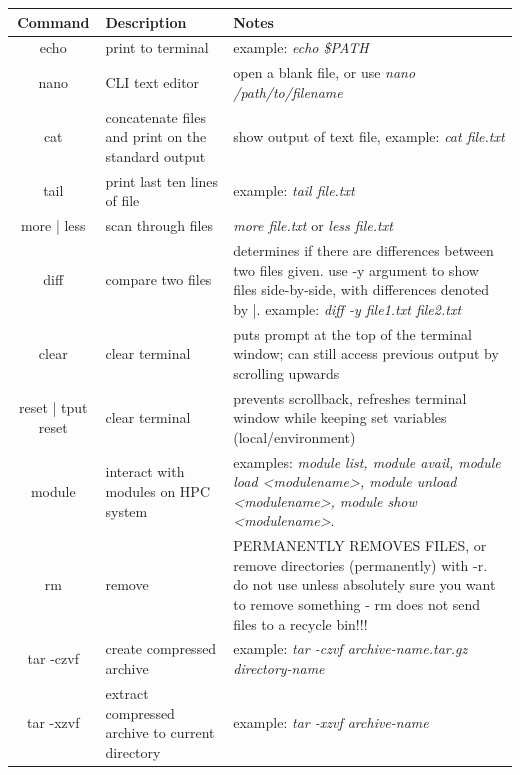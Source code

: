 \documentclass[12pt]{article}
\begin{document}
\begin{table}[H]
\begin{changemargin}{-1.5cm}{-1.5cm}
\centering
{\renewcommand{\arraystretch}{1.4}%
\begin{tabular}{|c|C{4.5cm}|C{9.5cm}|}
\hline
\textbf{Command} & \textbf{Description} & \textbf{Notes} \\
\hline
echo & print to terminal & example: \textit{echo \$PATH}\\
nano & CLI text editor & open a blank file, or use \textit{nano /path/to/filename} \\
cat & concatenate files and print on the standard output & show output of text file, example: \textit{cat file.txt} \\
tail & print last ten lines of file & example: \textit{tail file.txt} \\
more | less & scan through files & \textit{more file.txt} or \textit{less file.txt} \\ 
diff & compare two files & determines if there are differences between two files given. use -y argument to show files side-by-side, with differences denoted by |. example: \textit{diff -y file1.txt file2.txt} \\
clear & clear terminal & puts prompt at the top of the terminal window; can still access previous output by scrolling upwards \\
reset | tput reset & clear terminal & prevents scrollback, refreshes terminal window while keeping set variables (local/environment) \\
module & interact with modules on HPC system & examples: \textit{module list, module avail, module load <modulename>, module unload <modulename>, module show <modulename>}. \\
rm & remove & PERMANENTLY REMOVES FILES, or remove directories (permanently) with -r. do not use unless absolutely sure you want to remove something - rm does not send files to a recycle bin!!! \\
tar -czvf & create compressed archive & example: \textit{tar -czvf archive-name.tar.gz directory-name} \\
tar -xzvf & extract compressed archive to current directory & example: \textit{tar -xzvf archive-name} \\

\hline
\end{tabular}
}
\end{changemargin}
\end{table}
\newpage
\end{document}
